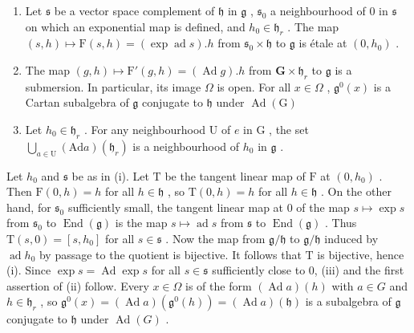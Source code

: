 \begin{enumerate}
\def\labelenumi{(\roman{enumi})}
\item
  Let \(\mathfrak{s}\) be a vector space complement of \(\mathfrak{h}\) in \(\mathfrak{g}\) , \(\mathfrak{s}_0\) a neighbourhood of 0 in \(\mathfrak{s}\) on which an exponential map is defined, and \(h_0 \in \mathfrak{h}_r\) . The map \((s, h) \mapsto \mathrm{F}(s, h) = (\exp \operatorname{ad} s).h\) from \(\mathfrak{s}_0 \times \mathfrak{h}\) to \(\mathfrak{g}\) is étale at \((0, h_0)\) .
\item
  The map \((g,h)\mapsto \mathrm{F}'(g,h) = (\operatorname {Ad}g).h\) from \(\mathbf{G}\times \mathfrak{h}_r\) to \(\mathfrak{g}\) is a submersion. In particular, its image \(\Omega\) is open. For all \(x\in \Omega\) , \(\mathfrak{g}^0 (x)\) is a Cartan subalgebra of \(\mathfrak{g}\) conjugate to \(\mathfrak{h}\) under \(\operatorname {Ad}(\mathrm{G})\)
\item
  Let \(h_0 \in \mathfrak{h}_r\) . For any neighbourhood \(\mathrm{U}\) of \(e\) in \(\mathrm{G}\) , the set \(\bigcup_{a \in \mathrm{U}} (\mathrm{Ad}a)(\mathfrak{h}_r)\) is a neighbourhood of \(h_0\) in \(\mathfrak{g}\) .
\end{enumerate}

Let \(h_0\) and \(\mathfrak{s}\) be as in (i). Let \(\mathrm{T}\) be the tangent linear map of \(\mathrm{F}\) at \((0, h_0)\) . Then \(\mathrm{F}(0, h) = h\) for all \(h \in \mathfrak{h}\) , so \(\mathrm{T}(0, h) = h\) for all \(h \in \mathfrak{h}\) . On the other hand, for \(\mathfrak{s}_0\) sufficiently small, the tangent linear map at 0 of the map \(s \mapsto \exp s\) from \(\mathfrak{s}_0\) to \(\operatorname{End}(\mathfrak{g})\) is the map \(s \mapsto \operatorname{ad}s\) from \(\mathfrak{s}\) to \(\operatorname{End}(\mathfrak{g})\) . Thus \(\mathrm{T}(s, 0) = [s, h_0]\) for all \(s \in \mathfrak{s}\) . Now the map from \(\mathfrak{g}/\mathfrak{h}\) to \(\mathfrak{g}/\mathfrak{h}\) induced by \(\operatorname{ad}h_0\) by passage to the quotient is bijective. It follows that \(\mathrm{T}\) is bijective, hence (i). Since \(\exp s = \operatorname{Ad}\exp s\) for all \(s \in \mathfrak{s}\) sufficiently close to 0, (iii) and the first assertion of (ii) follow. Every \(x \in \Omega\) is of the form \((\operatorname{Ad}a)(h)\) with \(a \in G\) and \(h \in \mathfrak{h}_r\) , so \(\mathfrak{g}^0(x) = (\operatorname{Ad}a)(\mathfrak{g}^0(h)) = (\operatorname{Ad}a)(\mathfrak{h})\) is a subalgebra of \(\mathfrak{g}\) conjugate to \(\mathfrak{h}\) under \(\operatorname{Ad}(G)\) .

